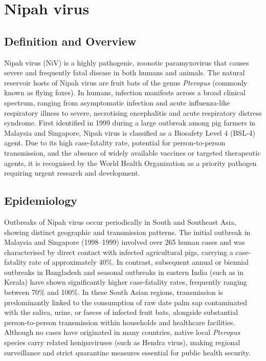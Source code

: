 \chapter{Nipah virus}

\section*{Definition and Overview}
Nipah virus (NiV) is a highly pathogenic, zoonotic paramyxovirus that causes severe and frequently fatal disease in both humans and animals. The natural reservoir hosts of Nipah virus are fruit bats of the genus \textit{Pteropus} (commonly known as flying foxes). In humans, infection manifests across a broad clinical spectrum, ranging from asymptomatic infection and acute influenza-like respiratory illness to severe, necrotising encephalitis and acute respiratory distress syndrome. First identified in 1999 during a large outbreak among pig farmers in Malaysia and Singapore, Nipah virus is classified as a Biosafety Level 4 (BSL-4) agent. Due to its high case-fatality rate, potential for person-to-person transmission, and the absence of widely available vaccines or targeted therapeutic agents, it is recognised by the World Health Organization as a priority pathogen requiring urgent research and development.

\section*{Epidemiology}
Outbreaks of Nipah virus occur periodically in South and Southeast Asia, showing distinct geographic and transmission patterns. The initial outbreak in Malaysia and Singapore (1998--1999) involved over 265 human cases and was characterised by direct contact with infected agricultural pigs, carrying a case-fatality rate of approximately 40\%. In contrast, subsequent annual or biennial outbreaks in Bangladesh and seasonal outbreaks in eastern India (such as in Kerala) have shown significantly higher case-fatality rates, frequently ranging between 70\% and 100\%. In these South Asian regions, transmission is predominantly linked to the consumption of raw date palm sap contaminated with the saliva, urine, or faeces of infected fruit bats, alongside substantial person-to-person transmission within households and healthcare facilities. Although no cases have originated in many countries, native local \textit{Pteropus} species carry related henipaviruses (such as Hendra virus), making regional surveillance and strict quarantine measures essential for public health security.


